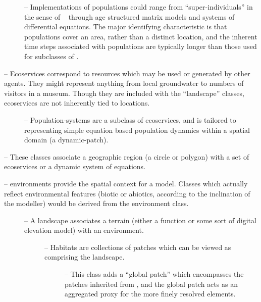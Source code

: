 \begin{description}
\begin{description}
\begin{description}
    \item[] -- Implementations of populations
      could range from ``super-individuals'' in the sense of
      ~\citet{scheffer1995super} through age structured matrix
      models and systems of differential equations. The major 
      identifying characteristic is that populations cover an
      area, rather than a distinct location, and the inherent time
      steps associated with populations are typically longer
      than those used for subclasses of .
    \end{description}

  \item[\TTC{ecoservice}] -- Ecoservices correspond to resources
    which may be used or generated by other agents.  They might
    represent anything from local groundwater to numbers of visitors
    in a museum.  Though they are included with the
    ``landscape'' classes, ecoservices are not inherently tied to
    locations.

    \begin{description}
    \item[] -- Population-systems are a
      subclass of ecoservices, and is tailored to representing
      simple equation based population dynamics within a spatial
      domain (a dynamic-patch).
    \end{description}

  \item[\TTC{patch}, \TTC{dynamic-patch}] -- These classes associate a
    geographic region (a circle or polygon) with a set of
    ecoservices or a dynamic system of equations.

  \item[\TTC{environment}] -- environments provide the spatial context
    for a model.  Classes which actually reflect environmental
    features (biotic or abiotics, according to the inclination of
    the modeller) would be derived from the environment class.

    \begin{description}
    \item[] -- A landscape associates a terrain
      (either a function or some sort of digital elevation model)
      with an environment.
      
      \begin{description}
      \item[] -- Habitats are collections of patches
        which can be viewed as comprising the landscape.
        \begin{description}
        \item[] -- This class adds a ``global patch''
          which encompasses the patches inherited from ,
          and the global patch acts as an aggregated proxy for the
          more finely resolved elements.
        \end{description}
      \end{description}
    \end{description}
  \end{description}
\end{description}


